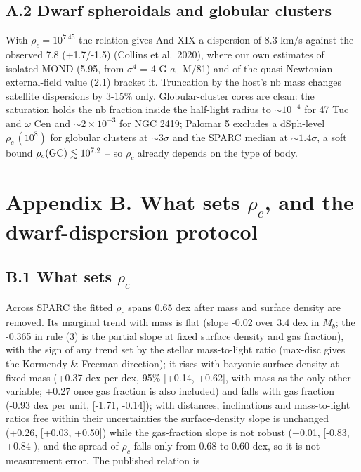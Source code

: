\documentclass[
  10pt,
]{article}
\begin{document}
\subsection{A.2 Dwarf spheroidals and globular clusters}\label{dwarf-spheroidals-and-globular-clusters}

With $\rho_c=10^{7.45}$ the relation gives And XIX a dispersion of 8.3 km/s
against the observed 7.8 (+1.7/-1.5) (Collins et al.~2020), where our own estimates of isolated MOND (5.95, from
$\sigma^4$ = 4 G $a_0$ M/81) and of the quasi-Newtonian external-field
value (2.1) bracket it.
Truncation by the host's nb mass changes satellite dispersions by 3-15\%
only. Globular-cluster cores are clean: the
saturation holds the nb fraction inside the half-light radius to
$\sim10^{-4}$ for 47 Tuc and $\omega$ Cen and $\sim2\times10^{-3}$ for
NGC 2419; Palomar 5 excludes a dSph-level $\rho_c\,(10^{8})$ for globular clusters
at $\sim3\sigma$ and the SPARC median at $\sim1.4\sigma$, a soft bound $\rho_c({\rm GC})\lesssim 10^{7.2}$ --
so $\rho_c$ already depends on the type of body.

\section{Appendix B. What sets \texorpdfstring{$\rho_c$}{rho c}, and the dwarf-dispersion protocol}\label{appendix-b.-what-sets-rho_c-and-the-dwarf-dispersion-protocol}

\subsection{B.1 What sets \texorpdfstring{$\rho_c$}{rho c}}\label{what-sets-rho_c}

Across SPARC the fitted $\rho_c$ spans 0.65 dex after mass and surface
density are removed. Its marginal trend with mass is flat (slope -0.02
over 3.4 dex in $M_b$; the -0.365 in rule (3) is the partial slope at
fixed surface density and gas fraction), with the sign of any trend set
by the stellar mass-to-light ratio (max-disc gives the Kormendy \&
Freeman direction); it rises with baryonic surface density at fixed mass
(+0.37 dex per dex, 95\% {[}+0.14, +0.62{]}, with mass as the only other
variable; +0.27 once gas fraction is also included) and falls with gas fraction (-0.93 dex per unit, {[}-1.71, -0.14{]}); with distances, inclinations and mass-to-light ratios free within their uncertainties the surface-density slope is unchanged (+0.26, {[}+0.03, +0.50{]}) while the gas-fraction slope is not robust (+0.01, {[}-0.83, +0.84{]}), and the spread of $\rho_c$ falls only from 0.68 to 0.60 dex, so it is not measurement error. The published
relation is
\end{document}

